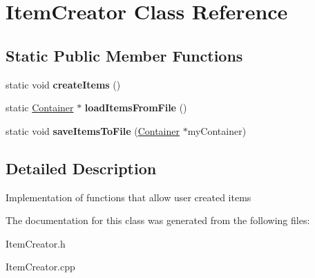 \hypertarget{class_item_creator}{}\section{Item\+Creator Class Reference}
\label{class_item_creator}
\subsection*{Static Public Member Functions}
\begin{DoxyCompactItemize}
\item 
\hypertarget{class_item_creator_a77e6cb2cf03ff0b57fdef8ed8a9ae68a}{}\label{class_item_creator_a77e6cb2cf03ff0b57fdef8ed8a9ae68a} 
static void {\bfseries create\+Items} ()
\item 
\hypertarget{class_item_creator_a8a2280445e40eb28e6bdb7dd77f35d71}{}\label{class_item_creator_a8a2280445e40eb28e6bdb7dd77f35d71} 
static \hyperlink{class_container}{Container} $\ast$ {\bfseries load\+Items\+From\+File} ()
\item 
\hypertarget{class_item_creator_a2e8e57784920cf17cbeb4001e1e23f58}{}\label{class_item_creator_a2e8e57784920cf17cbeb4001e1e23f58} 
static void {\bfseries save\+Items\+To\+File} (\hyperlink{class_container}{Container} $\ast$my\+Container)
\end{DoxyCompactItemize}


\subsection{Detailed Description}
Implementation of functions that allow user created items 

The documentation for this class was generated from the following files\+:\begin{DoxyCompactItemize}
\item 
Item\+Creator.\+h\item 
Item\+Creator.\+cpp\end{DoxyCompactItemize}
